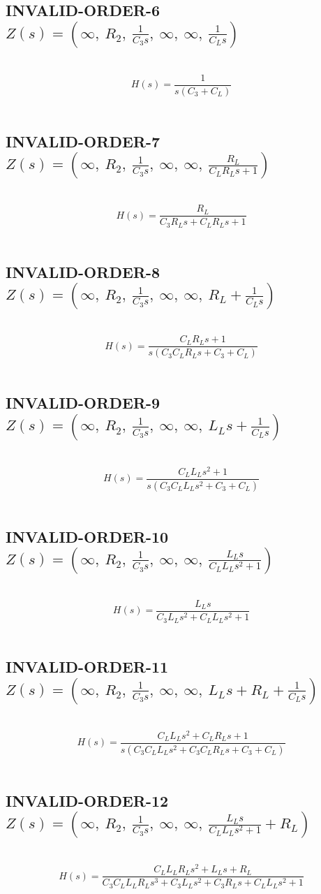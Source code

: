 \documentclass{article}
\begin{document}
\subsection{INVALID-ORDER-6 $Z(s) = \left( \infty, \  R_{2}, \  \frac{1}{C_{3} s}, \  \infty, \  \infty, \  \frac{1}{C_{L} s}\right)$ } \ 
\textbf{\[H(s) = \frac{1}{s \left(C_{3} + C_{L}\right)}\] } \ 
\subsection{INVALID-ORDER-7 $Z(s) = \left( \infty, \  R_{2}, \  \frac{1}{C_{3} s}, \  \infty, \  \infty, \  \frac{R_{L}}{C_{L} R_{L} s + 1}\right)$ } \ 
\textbf{\[H(s) = \frac{R_{L}}{C_{3} R_{L} s + C_{L} R_{L} s + 1}\] } \ 
\subsection{INVALID-ORDER-8 $Z(s) = \left( \infty, \  R_{2}, \  \frac{1}{C_{3} s}, \  \infty, \  \infty, \  R_{L} + \frac{1}{C_{L} s}\right)$ } \ 
\textbf{\[H(s) = \frac{C_{L} R_{L} s + 1}{s \left(C_{3} C_{L} R_{L} s + C_{3} + C_{L}\right)}\] } \ 
\subsection{INVALID-ORDER-9 $Z(s) = \left( \infty, \  R_{2}, \  \frac{1}{C_{3} s}, \  \infty, \  \infty, \  L_{L} s + \frac{1}{C_{L} s}\right)$ } \ 
\textbf{\[H(s) = \frac{C_{L} L_{L} s^{2} + 1}{s \left(C_{3} C_{L} L_{L} s^{2} + C_{3} + C_{L}\right)}\] } \ 
\subsection{INVALID-ORDER-10 $Z(s) = \left( \infty, \  R_{2}, \  \frac{1}{C_{3} s}, \  \infty, \  \infty, \  \frac{L_{L} s}{C_{L} L_{L} s^{2} + 1}\right)$ } \ 
\textbf{\[H(s) = \frac{L_{L} s}{C_{3} L_{L} s^{2} + C_{L} L_{L} s^{2} + 1}\] } \ 
\subsection{INVALID-ORDER-11 $Z(s) = \left( \infty, \  R_{2}, \  \frac{1}{C_{3} s}, \  \infty, \  \infty, \  L_{L} s + R_{L} + \frac{1}{C_{L} s}\right)$ } \ 
\textbf{\[H(s) = \frac{C_{L} L_{L} s^{2} + C_{L} R_{L} s + 1}{s \left(C_{3} C_{L} L_{L} s^{2} + C_{3} C_{L} R_{L} s + C_{3} + C_{L}\right)}\] } \ 
\subsection{INVALID-ORDER-12 $Z(s) = \left( \infty, \  R_{2}, \  \frac{1}{C_{3} s}, \  \infty, \  \infty, \  \frac{L_{L} s}{C_{L} L_{L} s^{2} + 1} + R_{L}\right)$ } \ 
\textbf{\[H(s) = \frac{C_{L} L_{L} R_{L} s^{2} + L_{L} s + R_{L}}{C_{3} C_{L} L_{L} R_{L} s^{3} + C_{3} L_{L} s^{2} + C_{3} R_{L} s + C_{L} L_{L} s^{2} + 1}\] } \ 
\end{document}
